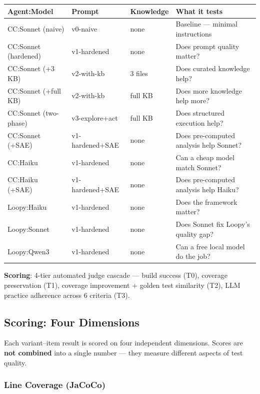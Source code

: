 \documentclass[11pt,a4paper]{article}
\begin{document}
\begin{table}[H]
\centering
\small
\begin{tabular}{@{}lllp{6cm}@{}}
\toprule
\textbf{Agent:Model} & \textbf{Prompt} & \textbf{Knowledge} & \textbf{What it tests} \\
\midrule
CC:Sonnet (naive)     & v0-naive    & none     & Baseline --- minimal instructions \\
CC:Sonnet (hardened)  & v1-hardened & none     & Does prompt quality matter? \\
CC:Sonnet (+3 KB)     & v2-with-kb  & 3 files  & Does curated knowledge help? \\
CC:Sonnet (+full KB)  & v2-with-kb  & full KB  & Does more knowledge help more? \\
CC:Sonnet (two-phase) & v3-explore+act & full KB & Does structured execution help? \\
CC:Sonnet (+SAE)      & v1-hardened+SAE & none & Does pre-computed analysis help Sonnet? \\
CC:Haiku              & v1-hardened & none     & Can a cheap model match Sonnet? \\
CC:Haiku (+SAE)       & v1-hardened+SAE & none & Does pre-computed analysis help Haiku? \\
Loopy:Haiku           & v1-hardened & none     & Does the framework matter? \\
Loopy:Sonnet          & v1-hardened & none     & Does Sonnet fix Loopy's quality gap? \\
Loopy:Qwen3           & v1-hardened & none     & Can a free local model do the job? \\
\bottomrule
\end{tabular}
\end{table}

\textbf{Scoring}: 4-tier automated judge cascade ---
build success (T0), coverage preservation (T1),
coverage improvement + golden test similarity (T2),
LLM practice adherence across 6 criteria (T3).

\subsection{Scoring: Four Dimensions}
\label{sec:scoring}

Each variant--item result is scored on four independent dimensions.
Scores are \textbf{not combined} into a single number --- they measure
different aspects of test quality.

\subsubsection{Line Coverage (JaCoCo)}
\end{document}
